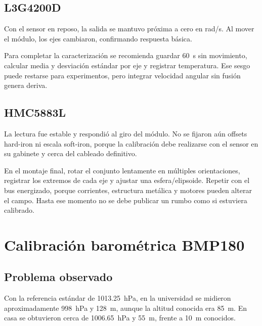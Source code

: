 \documentclass[11pt,a4paper,oneside]{report}
\begin{document}
\section{L3G4200D}
Con el sensor en reposo, la salida se mantuvo próxima a cero en rad/s. Al mover el
módulo, los ejes cambiaron, confirmando respuesta básica.


Para completar la caracterización se recomienda guardar 60~s sin movimiento, calcular
media y desviación estándar por eje y registrar temperatura. Ese sesgo puede
restarse para experimentos, pero integrar velocidad angular sin fusión genera deriva.

\section{HMC5883L}
La lectura fue estable y respondió al giro del módulo. No se fijaron aún offsets
hard-iron ni escala soft-iron, porque la calibración debe realizarse con el sensor en
su gabinete y cerca del cableado definitivo.


\begin{vspending}
En el montaje final, rotar el conjunto lentamente en múltiples orientaciones, registrar
los extremos de cada eje y ajustar una esfera/elipsoide. Repetir con el bus energizado,
porque corrientes, estructura metálica y motores pueden alterar el campo. Hasta ese
momento no se debe publicar un rumbo como si estuviera calibrado.
\end{vspending}

\chapter{Calibración barométrica BMP180}

\section{Problema observado}
Con la referencia estándar de \SI{1013.25}{\hecto\pascal}, en la universidad se
midieron aproximadamente \SI{998}{\hecto\pascal} y \SI{128}{\meter}, aunque la
altitud conocida era \SI{85}{\meter}. En casa se obtuvieron cerca de
\SI{1006.65}{\hecto\pascal} y \SI{55}{\meter}, frente a \SI{10}{\meter} conocidos.
\end{document}
